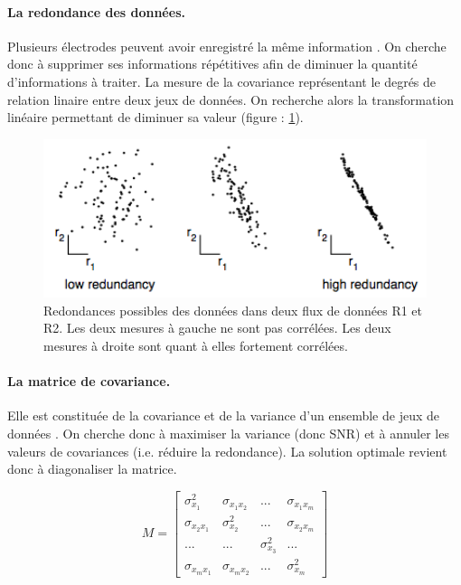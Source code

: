 \paragraph{La redondance des données.} Plusieurs électrodes peuvent avoir enregistré la même information \cite{PCA}  \cite{PCA2}. On cherche donc à supprimer ses informations répétitives afin de diminuer la quantité d'informations à traiter. La mesure de la covariance représentant le degrés de relation linaire entre deux jeux de données. On recherche alors la transformation linéaire permettant de diminuer sa valeur (figure : \ref{redondance}).   

\begin{figure}[h]
	\centering\includegraphics[width=12cm]{images/redondance.png}
	\caption[Redondances possibles dans les données dans deux flux de données R1 et R2.]{Redondances possibles des données dans deux flux de données R1 et R2. Les deux mesures à gauche ne sont pas corrélées. Les deux mesures à droite sont quant à elles fortement corrélées. \cite{PCA}}
	\label{redondance}
\end{figure}

\paragraph{La matrice de covariance.} Elle est constituée de la covariance et de la variance d'un ensemble de jeux de données \cite{PCA2}. On cherche donc à maximiser la variance (donc SNR) et à annuler les valeurs de covariances (i.e. réduire la redondance). La solution optimale revient donc à diagonaliser la matrice.

\[M =\begin{bmatrix}
\sigma^2_{x_1} & \sigma_{x_1x_2} & ... &\sigma_{x_1x_m}
\\\sigma_{x_2x_1} & \sigma^2_{x_2} & ... &\sigma_{x_2x_m} 
\\ ...&... &\sigma^2_{x_3} &...
\\ \sigma_{x_mx_1}&\sigma_{x_mx_2} & ...&\sigma^2_{x_m}  
\end{bmatrix}\]


